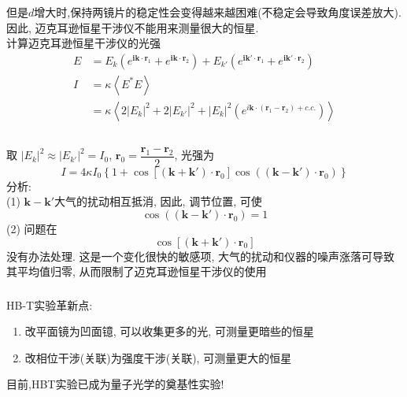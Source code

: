 \begin{frame} 
 \frametitle{}
 但是$d$增大时,保持两镜片的稳定性会变得越来越困难(不稳定会导致角度误差放大). 因此, 迈克耳逊恒星干涉仪不能用来测量很大的恒星. \\ {\vspace*{2.3em}}
 计算迈克耳逊恒星干涉仪的光强
 \[ \begin{aligned}
     E&= E_k (e^{\mathbf{ik}\cdot \mathbf{r}_1}+ e^{\mathbf{ik}\cdot \mathbf{r}_2}) + E_{k'} (e^{\mathbf{ik'}\cdot \mathbf{r}_1}+ e^{\mathbf{ik'}\cdot \mathbf{r}_2}) \\ 
     I&= \kappa \left\langle E^* E \right\rangle \\
     &= \kappa \left\langle 2 \left| E_k\right|^2 + 2\left| E_{k'}\right|^2 + \left|E_k\right|^2 (e ^{i \mathbf{k}\cdot(\mathbf{r}_1-\mathbf{r}_2)+c.c.})  \right\rangle \\
 \end{aligned}\]
\end{frame}

\begin{frame} 
\frametitle{}
 取 $\left| E_{k}\right|^2 \approx \left| E_{k'}\right|^2 = I_0$, $\mathbf{r}_0 = \dfrac{\mathbf{r}_1 - \mathbf{r}_2}{2}$,    
 光强为
 \[ I = 4 \kappa I_0 \left\{ 1+\cos\left[ (\mathbf{k} + \mathbf{k}')\cdot \mathbf{r}_0\right] \cos\left( (\mathbf{k} - \mathbf{k}')\cdot \mathbf{r}_0 \right)  \right\}\]
分析: \\ 
 (1) $\mathbf{k} - \mathbf{k}'$大气的扰动相互抵消, 因此, 调节位置, 可使 \[\cos\left( (\mathbf{k} - \mathbf{k}')\cdot \mathbf{r}_0 \right)=1 \]
(2) 问题在
\[ \cos\left[ (\mathbf{k} + \mathbf{k}') \cdot \mathbf{r}_0 \right] \]
没有办法处理. 这是一个变化很快的敏感项, 大气的扰动和仪器的噪声涨落可导致其平均值归零, 从而限制了迈克耳逊恒星干涉仪的使用 
\end{frame}

\begin{frame} 
\frametitle{}
 HB-T实验革新点: \\
 \begin{enumerate}
     \item 改平面镜为凹面镱, 可以收集更多的光, 可测量更暗些的恒星
     \item 改相位干涉(关联)为强度干涉(关联), 可测量更大的恒星
 \end{enumerate}
 目前,HBT实验已成为量子光学的奠基性实验!
\end{frame}

